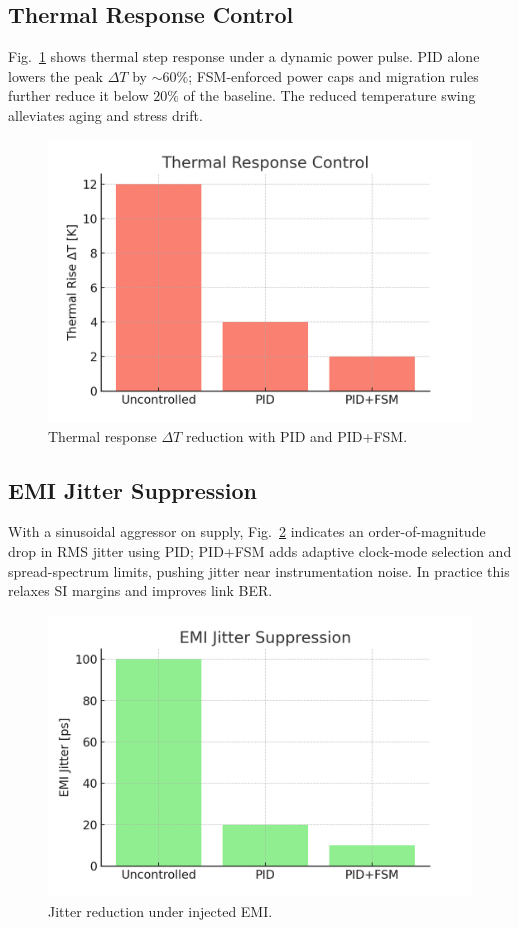 \documentclass[conference]{IEEEtran}
\begin{document}
\subsection{Thermal Response Control}
Fig.~\ref{fig:thermal} shows thermal step response under a dynamic power pulse. PID alone lowers the peak $\Delta T$ by $\sim\!60\%$; FSM-enforced power caps and migration rules further reduce it below $20\%$ of the baseline. The reduced temperature swing alleviates aging and stress drift.

\begin{figure}[t]
\centering
\includegraphics[width=0.95\linewidth]{figs/sim_thermal_response.png}
\caption{Thermal response $\Delta T$ reduction with PID and PID+FSM.}
\label{fig:thermal}
\end{figure}

\subsection{EMI Jitter Suppression}
With a sinusoidal aggressor on supply, Fig.~\ref{fig:emi} indicates an order-of-magnitude drop in RMS jitter using PID; PID+FSM adds adaptive clock-mode selection and spread-spectrum limits, pushing jitter near instrumentation noise. In practice this relaxes SI margins and improves link BER.

\begin{figure}[t]
\centering
\includegraphics[width=0.95\linewidth]{figs/sim_emi_jitter.png}
\caption{Jitter reduction under injected EMI.}
\label{fig:emi}
\end{figure}
\end{document}
